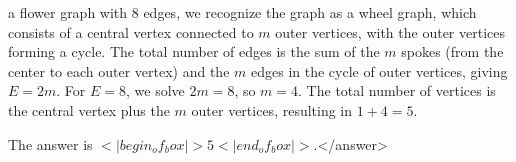 a flower graph with 8 edges, we recognize the graph as a wheel graph, which consists of a central vertex connected to \( m \) outer vertices, with the outer vertices forming a cycle. The total number of edges is the sum of the \( m \) spokes (from the center to each outer vertex) and the \( m \) edges in the cycle of outer vertices, giving \( E = 2m \). For \( E = 8 \), we solve \( 2m = 8 \), so \( m = 4 \). The total number of vertices is the central vertex plus the \( m \) outer vertices, resulting in \( 1 + 4 = 5 \).

The answer is \(<|begin_of_box|>5<|end_of_box|>\).</answer>
